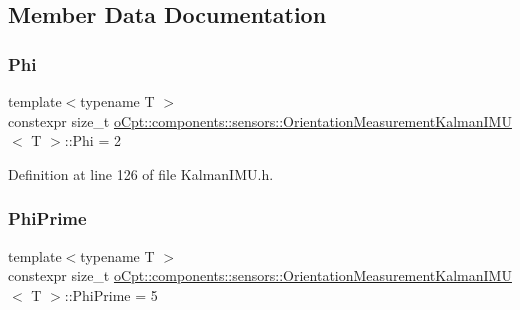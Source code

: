 \subsection{Member Data Documentation}
\hypertarget{classo_cpt_1_1components_1_1sensors_1_1_orientation_measurement_kalman_i_m_u_ae709fabcbb22cec01aab1bb96aed91fe}{}\label{classo_cpt_1_1components_1_1sensors_1_1_orientation_measurement_kalman_i_m_u_ae709fabcbb22cec01aab1bb96aed91fe} 
\subsubsection{\texorpdfstring{Phi}{Phi}}
{\footnotesize\ttfamily template$<$typename T $>$ \\
constexpr size\+\_\+t \hyperlink{classo_cpt_1_1components_1_1sensors_1_1_orientation_measurement_kalman_i_m_u}{o\+Cpt\+::components\+::sensors\+::\+Orientation\+Measurement\+Kalman\+I\+MU}$<$ T $>$\+::Phi = 2\hspace{0.3cm}{\ttfamily [static]}}



Definition at line 126 of file Kalman\+I\+M\+U.\+h.

\hypertarget{classo_cpt_1_1components_1_1sensors_1_1_orientation_measurement_kalman_i_m_u_a93336a20e6a61c78da26818acae70f75}{}\label{classo_cpt_1_1components_1_1sensors_1_1_orientation_measurement_kalman_i_m_u_a93336a20e6a61c78da26818acae70f75} 
\subsubsection{\texorpdfstring{Phi\+Prime}{PhiPrime}}
{\footnotesize\ttfamily template$<$typename T $>$ \\
constexpr size\+\_\+t \hyperlink{classo_cpt_1_1components_1_1sensors_1_1_orientation_measurement_kalman_i_m_u}{o\+Cpt\+::components\+::sensors\+::\+Orientation\+Measurement\+Kalman\+I\+MU}$<$ T $>$\+::Phi\+Prime = 5\hspace{0.3cm}{\ttfamily [static]}}




